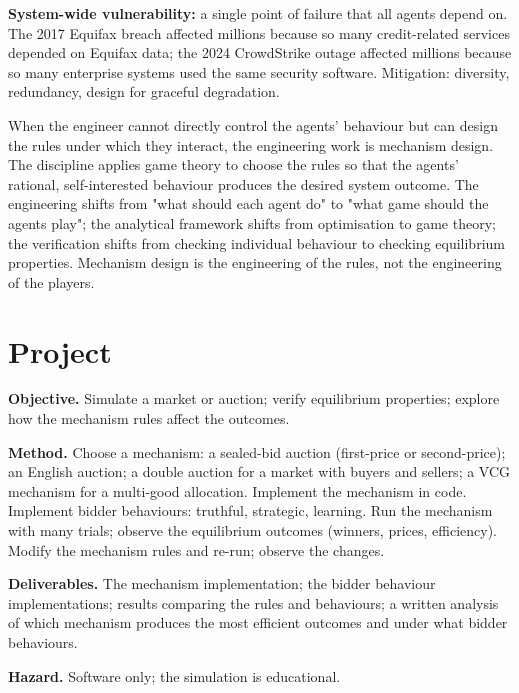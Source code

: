 \textbf{System-wide vulnerability:} a single point of failure that all agents depend on. The 2017 Equifax breach affected millions because so many credit-related services depended on Equifax data; the 2024 CrowdStrike outage affected millions because so many enterprise systems used the same security software. Mitigation: diversity, redundancy, design for graceful degradation.

\begin{principle}
When the engineer cannot directly control the agents' behaviour but can design the rules under which they interact, the engineering work is mechanism design. The discipline applies game theory to choose the rules so that the agents' rational, self-interested behaviour produces the desired system outcome. The engineering shifts from "what should each agent do" to "what game should the agents play"; the analytical framework shifts from optimisation to game theory; the verification shifts from checking individual behaviour to checking equilibrium properties. Mechanism design is the engineering of the rules, not the engineering of the players.
\end{principle}

\section{Project}

\begin{project}
\textbf{Objective.} Simulate a market or auction; verify equilibrium properties; explore how the mechanism rules affect the outcomes.

\textbf{Method.} Choose a mechanism: a sealed-bid auction (first-price or second-price); an English auction; a double auction for a market with buyers and sellers; a VCG mechanism for a multi-good allocation. Implement the mechanism in code. Implement bidder behaviours: truthful, strategic, learning. Run the mechanism with many trials; observe the equilibrium outcomes (winners, prices, efficiency). Modify the mechanism rules and re-run; observe the changes.

\textbf{Deliverables.} The mechanism implementation; the bidder behaviour implementations; results comparing the rules and behaviours; a written analysis of which mechanism produces the most efficient outcomes and under what bidder behaviours.

\textbf{Hazard.} Software only; the simulation is educational.
\end{project}

